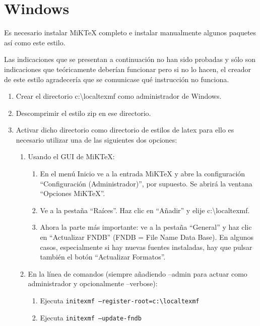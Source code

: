 \section{Windows\textsuperscript{\texttrademark}}

Es necesario instalar MiKTeX completo e instalar manualmente algunos paquetes así como este estilo.

Las indicaciones que se presentan a continuación no han sido probadas y sólo son indicaciones que teóricamente deberían funcionar pero si no lo hacen, el creador de este estilo agradecería que se comunicase qué instrucción no funciona.

\begin{enumerate}
  \item Crear el directorio c:{\textbackslash}localtexmf como administrador de Windows.
  \item Descomprimir el estilo zip en ese directorio.
  \item Activar dicho directorio como directorio de estilos de latex para ello es necesario utilizar una de las siguientes dos opciones:
  \begin{enumerate}
    \item Usando el GUI de MiKTeX:
    \begin{enumerate}
      \item En el menú Inicio ve a la entrada MiKTeX y abre la configuración ``Configuración (Administrador)'', por supuesto. Se abrirá la ventana ``Opciones MiKTeX''.
      \item Ve a la pestaña ``Raíces''. Haz clic en ``Añadir'' y elije c:{\textbackslash}localtexmf.
      \item Ahora la parte más importante: ve a la pestaña ``General'' y haz clic en ``Actualizar FNDB'' (FNDB = File Name Data Base). En algunos casos, especialmente si hay nuevas fuentes instaladas, hay que pulsar también el botón ``Actualizar Formatos''.
    \end{enumerate}
    \item En la línea de comandos (siempre añadiendo --admin para actuar como administrador y opcionalmente --verbose):
    \begin{enumerate}
      \item Ejecuta \texttt{initexmf --register-root=c:{\textbackslash}localtexmf}
      \item Ejecuta \texttt{initexmf --update-fndb}
    \end{enumerate}
  \end{enumerate}
\end{enumerate}

